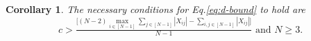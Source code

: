 \documentclass[lettersize,journal]{IEEEtran}
\newtheorem{corollary}{Corollary}
\begin{document}
\begin{corollary}
The necessary conditions for Eq.\eqref{eq:d-bound} to hold are
\begin{equation*}
    c > \tfrac{\Big[(N-2)\max\limits_{i\in[N-1]} \sum\limits_{j\in[N-1]}|X_{ij}| - \sum\limits_{i,j\in[N-1]}|X_{ij}|\Big]}{N-1}\text{ and } N\geq3.
\end{equation*}
\end{corollary}
\end{document}
